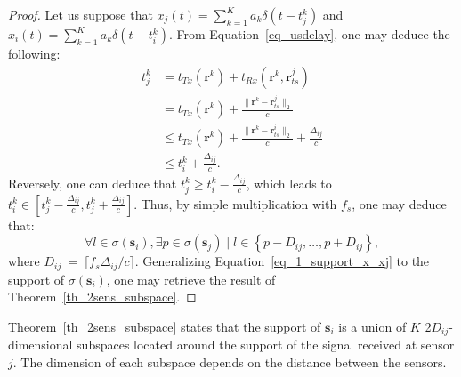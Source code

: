 \documentclass{article}
\newcommand{\vect}[1]{\bm{#1}}
\newcommand{\ser}[2]{#1^{#2}}
\theoremstyle{definition}
\begin{document}
\begin{proof}
	Let us suppose that $x_j \left(t\right) = \sum_{k=1}^{K} a_k \delta \left(t - \ser{t_j}{k}\right)$ and $x_i \left(t\right) = \sum_{k=1}^{K} a_k \delta \left(t - \ser{t_i}{k}\right)$. From Equation~\eqref{eq_usdelay}, one may deduce the following:
	\begin{align*}
	\ser{t_j}{k} &= t_{Tx}\left(\vect{r}^k\right) + t_{Rx}\left(\vect{r}^k, \ser{\vect{r}_{ts}}{j}\right) \\
	&= t_{Tx}\left(\vect{r}^k\right) + \frac{\|\vect{r}^k - \ser{\vect{r}_{ts}}{j} \|_2}{c}\\
	&\leq  t_{Tx}\left(\vect{r}^k\right) + \frac{\|\vect{r}^k - \ser{\vect{r}_{ts}}{i} \|_2}{c} + \frac{\Delta_{ij}}{c}\\
	&\leq \ser{t_i}{k} + \frac{\Delta_{ij}}{c}.
	\end{align*}
	Reversely, one can deduce that $\ser{t_j}{k} \geq \ser{t_i}{k} - \frac{\Delta_{ij}}{c}$, which leads to $\ser{t_i}{k} \in \left[\ser{t_j}{k} -\frac{\Delta_{ij}}{c}, \ser{t_j}{k} +\frac{\Delta_{ij}}{c}\right]$. Thus, by simple multiplication with $f_s$, one may deduce that:
	\begin{equation}
	\label{eq_1_support_x_xj}
		\forall l \in \sigma\left(\vect{s}_i\right), \exists p \in \sigma \left(\vect{s}_j\right) \; | \; l \in \left\lbrace p-D_{ij},\dots,p+D_{ij}\right\rbrace,
	\end{equation}
	where $D_{ij}~=~\lceil f_s \Delta_{ij}/ c  \rceil$. Generalizing Equation~\eqref{eq_1_support_x_xj} to the support of $\sigma\left(\vect{s}_i\right)$, one may retrieve the result of Theorem~\ref{th_2sens_subspace}.
\end{proof}
Theorem~\ref{th_2sens_subspace} states that the support of $\vect{s}_i$ is a union of $K$ \num{2}$D_{ij}$-dimensional subspaces located around the support of the signal received at sensor $j$. The dimension of each subspace depends on the distance between the sensors. 
\end{document}
